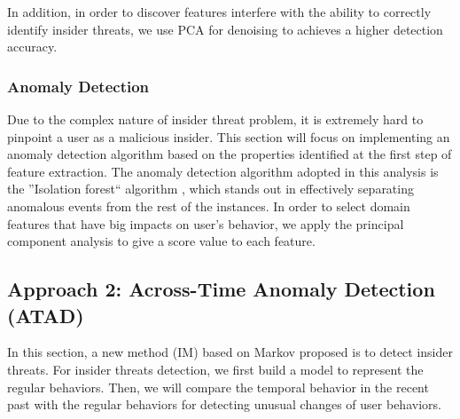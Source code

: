 \documentclass[conference]{IEEEtran}
\begin{document}
In addition, in order to discover features interfere with the ability to
correctly identify insider threats, we use PCA \cite{b19} for denoising to achieves a higher
detection accuracy.
\subsubsection{Anomaly Detection}

Due to the complex nature of insider threat problem, it is extremely hard to pinpoint a user as a malicious insider. This section will focus on implementing an anomaly detection algorithm based on the properties identified at the first step of feature extraction. The anomaly detection algorithm adopted in this analysis is the ''Isolation forest`` algorithm \cite{b20}, which stands out in effectively separating anomalous events from the rest of the instances. In order to select domain features that have big impacts on user's behavior, we apply the principal component analysis to give a score value to each feature. 

\subsection{Approach 2: Across-Time Anomaly Detection (ATAD)}

In this section, a new method (IM) based on Markov proposed is to detect insider threats. For insider threats detection, we first build a model to represent the regular behaviors. Then, we will compare the temporal behavior in the recent past with the regular behaviors for detecting unusual changes of user behaviors.
 

\end{document}
